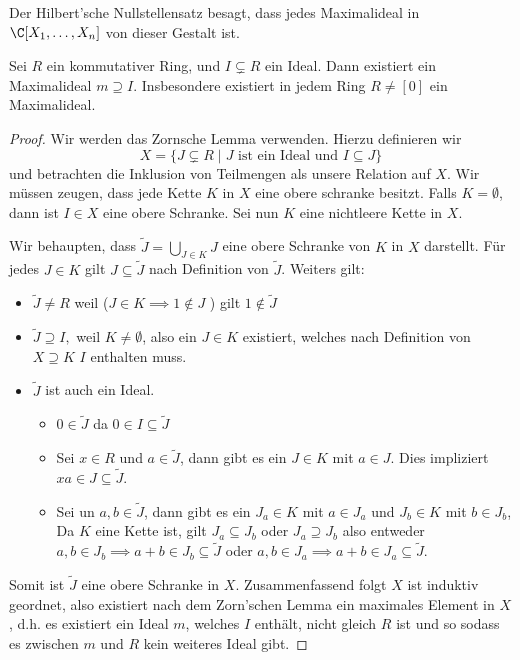 \begin{remark}
	Der Hilbert'sche Nullstellensatz besagt, dass jedes Maximalideal in $\C[X_1,\ldots,X_{n}]$ von dieser Gestalt ist.
\end{remark}

\begin{theorem}
	Sei $R$ ein kommutativer Ring, und $I \subsetneq R$ ein Ideal. Dann existiert ein Maximalideal $m \supseteq I$.
	Insbesondere existiert in jedem Ring $R \neq [0]$ ein Maximalideal.
\end{theorem}

\begin{proof}
	Wir werden das Zornsche Lemma verwenden. Hierzu definieren wir
	\[
	X = \{J \subsetneq R \mid J \text{ ist ein Ideal und } I \subseteq J\} 
	\]
	und betrachten die Inklusion von Teilmengen als unsere Relation auf $X$.
	Wir müssen zeugen, dass jede Kette $K$ in $X$ eine obere schranke besitzt.
	Falls $K = \emptyset$, dann ist $I \in X$ eine obere Schranke.
	Sei nun $K$ eine nichtleere Kette in $X$.

	Wir behaupten, dass $\widetilde{J} = \bigcup_{J \in K} J$ eine obere Schranke von $K$ in $X$ darstellt.
	Für jedes $J \in K$ gilt $J \subseteq \widetilde{J}$ nach Definition von $\widetilde{J}$.
	Weiters gilt:
	\begin{itemize}
		\item $\widetilde{J} \neq R$ weil ($J \in K \implies 1 \not\in J$ ) gilt $1 \not\in \widetilde{J}$ 
		\item $\widetilde{J} \supseteq I,$ weil $K \neq \emptyset$, also ein $J \in K$ existiert, welches nach Definition von $X \supseteq K$ $I$ enthalten muss.
		\item $\widetilde{J}$ ist auch ein Ideal.
			\begin{itemize}
				\item $0 \in \widetilde{J}$ da $0 \in I \subseteq \widetilde{J}$ 
				\item Sei $x \in R$ und $a \in \widetilde{J}$, dann gibt es ein $J \in K$ mit $a \in J$.
					Dies impliziert $xa \in J \subseteq \widetilde{J}$.
				\item Sei un $a,b \in \widetilde{J}$, dann gibt es ein $J_{a} \in K$ mit $a \in J_{a}$ und $J_{b} \in K$ mit $b \in J_{b}$,
					Da $K$ eine Kette ist, gilt $J_{a} \subseteq J_{b}$ oder $J_{a} \supseteq J_{b}$ also entweder $a,b \in J_{b} \implies a + b \in J_{b} \subseteq \widetilde{J}$ oder
					$a,b \in J_{a} \implies a+b \in J_{a} \subseteq \widetilde{J}$.
			\end{itemize}
	\end{itemize}
	Somit ist $\widetilde{J}$ eine obere Schranke in $X$.
	Zusammenfassend folgt $X$ ist induktiv geordnet, also existiert nach dem Zorn'schen Lemma ein maximales Element in $X$, d.h. es existiert ein Ideal $m$,
	welches  $I$ enthält, nicht gleich $R$ ist und so sodass es zwischen $m$ und $R$ kein weiteres Ideal gibt.
\end{proof}





















